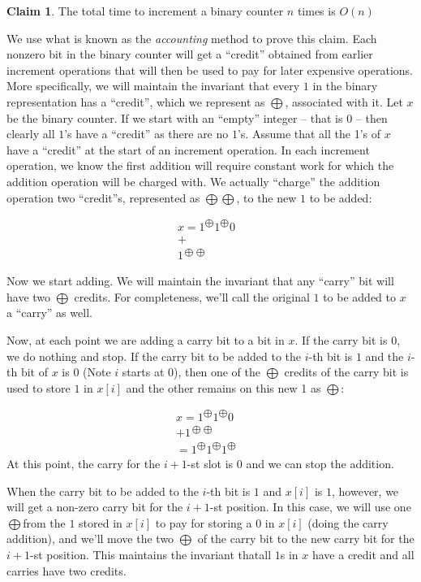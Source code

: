\documentclass [12pt]{article}
\theoremstyle{definition}
\newtheorem{claim}{Claim}
\begin{document}
\begin{claim}{The total time to increment a binary counter $n$ times is $O(n)$} 

We use what is known as the \textit{accounting} method to prove this claim. Each nonzero bit in the binary counter will get a ``credit'' obtained from earlier increment operations that will then be used to pay for later expensive operations. More specifically, we will maintain the invariant that every $1$ in the binary representation has a ``credit'', which we represent as $\bigoplus$, associated with it. Let $x$ be the binary counter. If we start with an ``empty'' integer – that is $0$ – then clearly all $1$'s have a ``credit'' as there are no $1$'s. Assume that all the 1's of $x$ have a ``credit'' at the start of an increment operation. In each increment operation, we know the first addition will require constant work for which the addition operation will be charged with. We actually ``charge'' the addition operation two ``credit''s, represented as $\bigoplus\bigoplus$, to the new $1$ to be added:

\begin{align*}
x = 1^{\bigoplus}1^{\bigoplus}0& \\
+& \\
1^{\bigoplus \bigoplus}
\end{align*}

Now we start adding. We will maintain the invariant that any ``carry'' bit will have two $\bigoplus$ credits. For completeness, we'll call the original $1$ to be added to $x$ a ``carry'' as well. 

Now, at each point we are adding a carry bit to a bit in $x$. If the carry bit is $0$, we do nothing and stop. If the carry bit to be added to the $i$-th bit is $1$ and the $i$-th bit of $x$ is $0$ (Note $i$ starts at $0$), then one of the $\bigoplus$ credits of the carry bit is used to store $1$ in $x[i]$ and the other remains on this new 1 as $\bigoplus$:

\begin{align*}
x = 1^{\bigoplus}1^{\bigoplus}0& \\
+ 1^{\bigoplus \bigoplus} \\
= 1^{\bigoplus}1^{\bigoplus}1^{\bigoplus} &
\end{align*}
At this point, the carry for the $i + 1$-st slot is $0$ and we can stop the addition.

When the carry bit to be added to the $i$-th bit is $1$ and $x[i]$ is $1$, however, we will get a non-zero carry bit for the $i + 1$-st position. In this case, we will use one $\bigoplus$from the $1$ stored in $x[i]$ to pay for storing a $0$ in $x[i]$ (doing the carry addition), and we'll move the two $\bigoplus$ of the carry bit to the new carry bit for the $i + 1$-st position. This maintains the invariant thatall $1$s in $x$ have a credit and all carries have two credits.


\end{claim}
\end{document}
